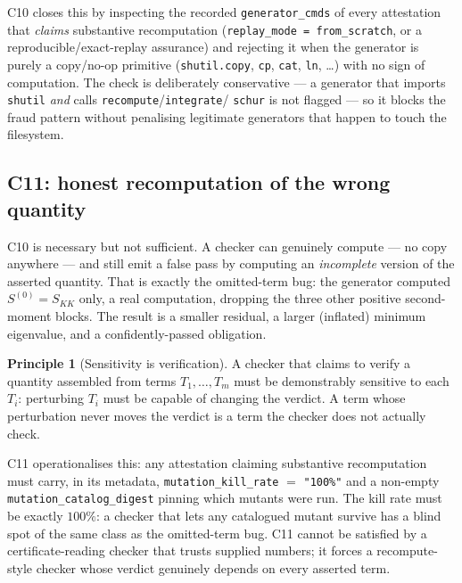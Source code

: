 \documentclass[11pt,a4paper]{amsart}
\theoremstyle{plain}
\theoremstyle{definition}
\newtheorem{principle}[theorem]{Principle}
\newcommand{\CtenA}{\textsf{C10}}
\newcommand{\CelevenA}{\textsf{C11}}
\begin{document}
\CtenA{} closes this by inspecting the recorded \texttt{generator\_cmds} of every
attestation that \emph{claims} substantive recomputation (\texttt{replay\_mode =
from\_scratch}, or a reproducible/exact-replay assurance) and rejecting it when
the generator is purely a copy/no-op primitive
(\texttt{shutil.copy}, \texttt{cp}, \texttt{cat}, \texttt{ln}, \dots) with no
sign of computation. The check is deliberately conservative --- a generator that
imports \texttt{shutil} \emph{and} calls \texttt{recompute}/\texttt{integrate}/
\texttt{schur} is not flagged --- so it blocks the fraud pattern without
penalising legitimate generators that happen to touch the filesystem.

\subsection{\texorpdfstring{\CelevenA}{C11}: honest recomputation of the wrong quantity}

\CtenA{} is necessary but not sufficient. A checker can genuinely compute --- no
copy anywhere --- and still emit a false pass by computing an \emph{incomplete}
version of the asserted quantity. That is exactly the omitted-term bug: the
generator computed $S^{(0)} = S_{KK}$ only, a real computation, dropping the
three other positive second-moment blocks. The result is a smaller residual, a
larger (inflated) minimum eigenvalue, and a confidently-passed obligation.

\begin{principle}[Sensitivity is verification]
A checker that claims to verify a quantity assembled from terms
$T_1,\dots,T_m$ must be demonstrably sensitive to each $T_i$: perturbing $T_i$
must be capable of changing the verdict. A term whose perturbation never moves
the verdict is a term the checker does not actually check.
\end{principle}

\CelevenA{} operationalises this: any attestation claiming substantive
recomputation must carry, in its metadata, \texttt{mutation\_kill\_rate}
$=$ \texttt{"100\%"} and a non-empty \texttt{mutation\_catalog\_digest} pinning
which mutants were run. The kill rate must be exactly $100\%$: a checker that
lets any catalogued mutant survive has a blind spot of the same class as the
omitted-term bug. \CelevenA{} cannot be satisfied by a certificate-reading
checker that trusts supplied numbers; it forces a recompute-style checker whose
verdict genuinely depends on every asserted term.
\end{document}
